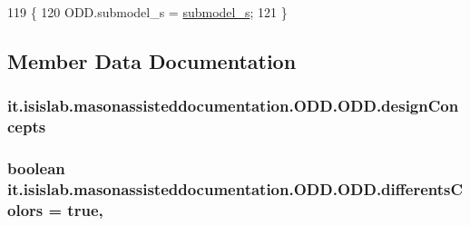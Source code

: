 \begin{DoxyCode}
119                                                             \{
120         ODD.submodel\_s = \hyperlink{classit_1_1isislab_1_1masonassisteddocumentation_1_1_o_d_d_1_1_o_d_d_a828127e4a115a98ea6e6dba0a637c9ff}{submodel\_s};
121     \}
\end{DoxyCode}


\subsection{Member Data Documentation}
\hypertarget{classit_1_1isislab_1_1masonassisteddocumentation_1_1_o_d_d_1_1_o_d_d_a70595ed3a3526edf3544088af9b945de}{
\subsubsection[{design\-Concepts}]{ it.\-isislab.\-masonassisteddocumentation.\-O\-D\-D.\-O\-D\-D.\-design\-Concepts\hspace{0.3cm}{\ttfamily [static]}}}\label{classit_1_1isislab_1_1masonassisteddocumentation_1_1_o_d_d_1_1_o_d_d_a70595ed3a3526edf3544088af9b945de}
\hypertarget{classit_1_1isislab_1_1masonassisteddocumentation_1_1_o_d_d_1_1_o_d_d_a5e99cecaa409eacae00aceb1bbd62a56}{
\subsubsection[{differents\-Colors}]{\setlength{\rightskip}{0pt plus 5cm}boolean it.\-isislab.\-masonassisteddocumentation.\-O\-D\-D.\-O\-D\-D.\-differents\-Colors = true\hspace{0.3cm}{\ttfamily [static]}, {\ttfamily [private]}}}\label{classit_1_1isislab_1_1masonassisteddocumentation_1_1_o_d_d_1_1_o_d_d_a5e99cecaa409eacae00aceb1bbd62a56}
